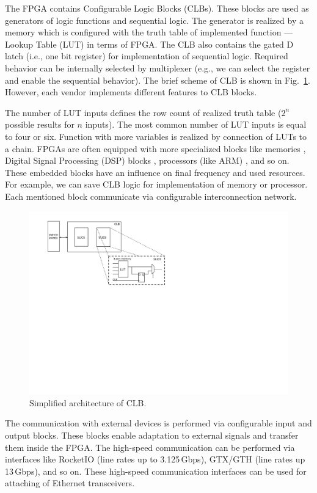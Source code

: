 The FPGA contains Configurable Logic Blocks (CLBs). These blocks are used as generators of logic functions and sequential logic.
The generator is realized by a memory which is configured with the truth table of implemented function --- Lookup Table (LUT) in terms of FPGA. 
The CLB also contains the gated D latch (i.e., one bit register) for implementation of sequential logic. 
Required behavior can be internally selected by multiplexer (e.g., we can select the register and enable the sequential behavior).
The brief scheme of CLB is shown in Fig.~\ref{fig:fpgaClb}. However, each vendor implements different features to CLB blocks.

The number of LUT inputs defines the row count of realized truth table ($2^n$ possible results for $n$ inputs). 
The most common number of LUT inputs is equal to four or six. Function with more variables is realized by connection of 
LUTs to a chain. FPGAs are often equipped with more specialized blocks like memories \cite{fpga-block-ram}, 
Digital Signal Processing (DSP) blocks \cite{fpga-dsp}, processors (like ARM) \cite{fpga-processor}, and so on. 
These embedded blocks have an influence on final frequency and used resources. 
For example, we can save CLB logic for implementation of memory or processor.
Each mentioned block communicate via configurable interconnection network. 

\begin{figure}[ht]
    \centering
    \includegraphics[scale=0.7]{chapters/pic/fpga-clb}
    \caption{Simplified architecture of CLB.}
    \label{fig:fpgaClb}
\end{figure}

The communication with external devices is performed via configurable input and output blocks. These blocks enable adaptation to external
signals and transfer them inside the FPGA. The high-speed communication can be performed via interfaces like 
RocketIO \cite{fpga-rocketio} (line rates up to 3.125\,Gbps), GTX/GTH \cite{fpga-gtx-gth} (line rates up 13\,Gbps), and so on. 
These high-speed communication interfaces can be used for attaching of Ethernet transceivers. 

